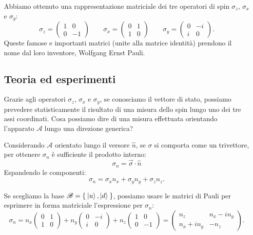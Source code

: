 Abbiamo ottenuto una rappresentazione matriciale dei tre operatori di spin $\sigma_z$, $\sigma_x$ e $\sigma_y$:
\begin{equation}
	\sigma_z = 
	\begin{pmatrix}
		1 & 0\\
		0 & -1
	\end{pmatrix} \quad\quad
	\sigma_x = 
	\begin{pmatrix}
		0 & 1\\
		1 & 0
	\end{pmatrix} \quad\quad
	\sigma_y = 
	\begin{pmatrix}
		0 & -i\\
		i & 0
	\end{pmatrix}.
	\label{eqn:pauli_op}
\end{equation}
Queste famose e importanti matrici (unite alla matrice identità) prendono il nome dal loro inventore, Wolfgang Ernst Pauli.

\subsection{Teoria ed esperimenti}
Grazie agli operatori $\sigma_z$, $\sigma_x$ e $\sigma_y$, se conosciamo il vettore di stato, possiamo prevedere statisticamente il risultato di una misura dello spin lungo uno dei tre assi coordinati. Cosa possiamo dire di una misura effettuata orientando l'apparato $\mathcal{A}$ lungo una direzione generica?

Considerando $\mathcal{A}$ orientato lungo il versore $\hat{n}$, se $\sigma$ si comporta come un trivettore, per ottenere $\sigma_n$ è sufficiente il prodotto interno:
\[
\sigma_n = \vec{\sigma} \cdot \hat{n}
\]
Espandendo le componenti:
\[
\sigma_n = \sigma_xn_x+\sigma_yn_y+\sigma_zn_z.
\]

Se scegliamo la base $\mathscr{B} = \Set{\Ket{u}, \Ket{d}}$, possiamo usare le matrici di Pauli per esprimere in forma matriciale l'espressione per $\sigma_n$:
\begin{equation*}
	\sigma_n = n_x
	\begin{pmatrix}
		0 & 1\\
		1 & 0
	\end{pmatrix}
	+ n_y
	\begin{pmatrix}
		0 & -i\\
		i & 0
	\end{pmatrix}
	+ n_z
	\begin{pmatrix}
		1 & 0\\
		0 & -1
	\end{pmatrix} 	
	= 
	\begin{pmatrix}
		n_z & n_x - in_y\\
		n_x + in_y & -n_z
	\end{pmatrix}.
\end{equation*}

